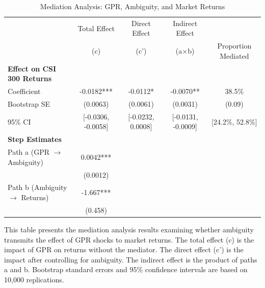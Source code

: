\documentclass[preprint,12pt,authoryear]{elsarticle}
\begin{document}
\begin{table}
\centering
\caption{Mediation Analysis: GPR, Ambiguity, and Market Returns}
\label{tab:mediation}
\begin{threeparttable}
\begin{tabular*}{\textwidth}{@{\extracolsep{\fill}} lcccc @{\extracolsep{\fill}}}
\toprule
& Total Effect & Direct Effect & Indirect Effect & \\
& (c) & (c') & (a$\times$b) & Proportion Mediated \\
\midrule
\midrule
\textbf{Effect on CSI 300 Returns} & & & & \\
Coefficient & -0.0182*** & -0.0112* & -0.0070** & 38.5\% \\
Bootstrap SE & (0.0063) & (0.0061) & (0.0031) & (0.09) \\
95\% CI & [-0.0306, -0.0058] & [-0.0232, 0.0008] & [-0.0131, -0.0009] & [24.2\%, 52.8\%] \\
\midrule
\textbf{Step Estimates} & & & & \\
Path a (GPR $\rightarrow$ Ambiguity) & 0.0042*** & & & \\
& (0.0012) & & & \\
Path b (Ambiguity $\rightarrow$ Returns) & -1.667*** & & & \\
& (0.458) & & & \\
\bottomrule
\end{tabular*}
\begin{tablenotes}[flushleft]
\small
\item[] This table presents the mediation analysis results examining whether ambiguity transmits the effect of GPR shocks to market returns. The total effect (c) is the impact of GPR on returns without the mediator. The direct effect (c') is the impact after controlling for ambiguity. The indirect effect is the product of paths a and b. Bootstrap standard errors and 95\% confidence intervals are based on 10,000 replications.
\end{tablenotes}
\end{threeparttable}
\end{table}
\end{document}
